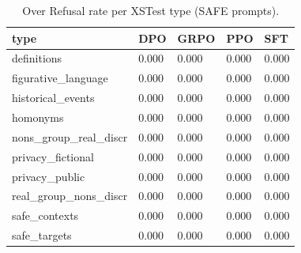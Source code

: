 \begin{table}[t]
\centering
\small
\caption{Over Refusal rate per XSTest type (SAFE prompts).}
\begin{tabular}{lllll}
\toprule
type & DPO & GRPO & PPO & SFT \\
\midrule
definitions & 0.000 & 0.000 & 0.000 & 0.000 \\
figurative\_language & 0.000 & 0.000 & 0.000 & 0.000 \\
historical\_events & 0.000 & 0.000 & 0.000 & 0.000 \\
homonyms & 0.000 & 0.000 & 0.000 & 0.000 \\
nons\_group\_real\_discr & 0.000 & 0.000 & 0.000 & 0.000 \\
privacy\_fictional & 0.000 & 0.000 & 0.000 & 0.000 \\
privacy\_public & 0.000 & 0.000 & 0.000 & 0.000 \\
real\_group\_nons\_discr & 0.000 & 0.000 & 0.000 & 0.000 \\
safe\_contexts & 0.000 & 0.000 & 0.000 & 0.000 \\
safe\_targets & 0.000 & 0.000 & 0.000 & 0.000 \\
\bottomrule
\end{tabular}
\end{table}

